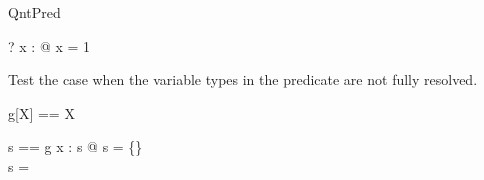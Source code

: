 \begin{zsection}
  \SECTION QntPred
\end{zsection}

\begin{zed}
  \vdash? \exists x : \nat @ x = 1
\end{zed}

Test the case when the variable types in the predicate are not fully 
resolved.
\begin{zed}
  g[X] == X
\end{zed}

\begin{axdef}
  s == g
\where
  \exists x : s @ s = \{\}\\
  s = \power \nat
\end{axdef}
